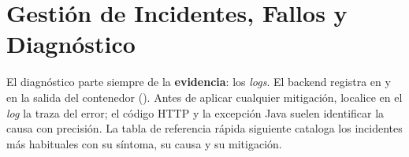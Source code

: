 \chapter[Gestión de Incidentes y Diagnóstico]{Gestión de Incidentes, Fallos y Diagnóstico}%
\label{ch:troubleshooting}

El diagnóstico parte siempre de la \textbf{evidencia}: los \textit{logs}. El backend
registra en  y en la salida del contenedor
(). Antes de aplicar cualquier mitigación, localice en el
\textit{log} la traza del error; el código HTTP y la excepción Java suelen identificar la
causa con precisión. La tabla de referencia rápida siguiente cataloga los incidentes más
habituales con su síntoma, su causa y su mitigación.\par

